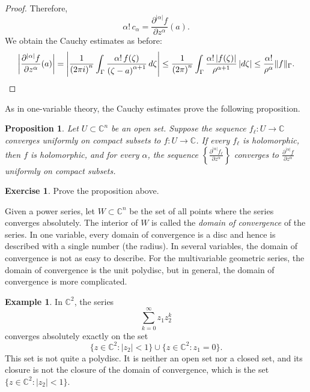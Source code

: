 \documentclass[12pt,openany]{book}
\newcommand{\sabs}[1]{\lvert {#1} \rvert}
\newcommand{\snorm}[1]{\lVert {#1} \rVert}
\newcommand{\abs}[1]{\left\lvert {#1} \right\rvert}
\newcommand{\C}{{\mathbb{C}}}
\newcommand{\myindex}[1]{#1\index{#1}}
\theoremstyle{plain}
\newtheorem{prop}[thm]{Proposition}
\theoremstyle{remark}
\theoremstyle{definition}
\newenvironment{exbox}{%
    \def\FrameCommand{\vrule width 1pt \relax\hspace{10pt}}%
    \MakeFramed{\advance\hsize-\width\FrameRestore}%
}{%
    \endMakeFramed
}
\theoremstyle{exercise}
\newtheorem{exercise}{Exercise}[section]
\theoremstyle{example}
\newtheorem{example}[thm]{Example}
\begin{document}
\begin{proof}
Therefore,
\begin{equation*}
\alpha! \, c_\alpha =
\frac{\partial^{\sabs{\alpha}} f}{\partial z^\alpha} (a) .
\end{equation*}
We obtain the Cauchy estimates as before:
\begin{equation*}
\abs{\frac{\partial^{\sabs{\alpha}}f}{\partial z^\alpha}(a)}
=
\abs{
\frac{1}{{(2\pi i)}^n}
\int_{\Gamma}
\frac{\alpha! \, f(\zeta)}{{(\zeta-a)}^{\alpha+1}}
\,
d \zeta }
\leq
\frac{1}{{(2\pi)}^n}
\int_{\Gamma}
\frac{\alpha! \, \sabs{f(\zeta)}}{\rho^{\alpha+1}}
\,
\sabs{d \zeta}
\leq
\frac{\alpha!}{\rho^\alpha}
\snorm{f}_\Gamma . \qedhere
\end{equation*}
\end{proof}

As in one-variable theory, the Cauchy estimates prove the following
proposition.

\begin{prop}
Let $U \subset \C^n$ be an open set.
Suppose the sequence $f_\ell \colon U \to \C$ converges uniformly on compact subsets
to $f \colon U \to \C$.  If every $f_\ell$ is holomorphic, then $f$ is
holomorphic, and for every $\alpha$, the sequence
$\left\{ \frac{\partial^{\sabs{\alpha}} f_\ell}{\partial z^\alpha}\right\}$
converges to
$\frac{\partial^{\sabs{\alpha}} f}{\partial z^\alpha}$ uniformly on compact
subsets.
\end{prop}

\begin{exbox}
\begin{exercise}
Prove the proposition above.
\end{exercise}
\end{exbox}

Given a power series,
let $W \subset \C^n$ be the set of all points where the series
converges absolutely.
The interior of $W$ is called the
\emph{\myindex{domain of convergence}} of the series.
In one variable, every domain of convergence is a disc and hence is
described with a single number (the radius).
In several variables, the domain of convergence
is not as easy to describe.
For the multivariable geometric series,
the domain of convergence is the unit polydisc,
but in general, the domain of convergence is more complicated.

\begin{example}
In $\C^2$, the series
\begin{equation*}
\sum_{k=0}^\infty z_1 z_2^k
\end{equation*}
converges absolutely exactly on the set
\begin{equation*}
\bigl\{ z \in \C^2 : \sabs{z_2} < 1 \bigr\}
\cup
\bigl\{ z \in \C^2 : z_1 = 0 \bigr\} .
\end{equation*}
This set is not quite a polydisc.  It is neither an open set nor a closed set,
and its closure is not the closure of the domain of convergence,
which is the set $\bigl\{ z \in \C^2 : \sabs{z_2} < 1 \bigr\}$.
\end{example}
\end{document}
